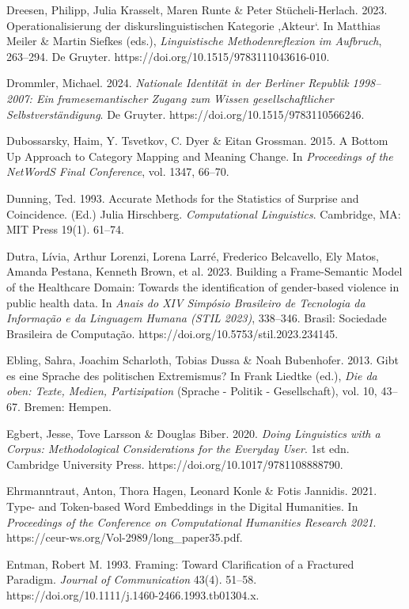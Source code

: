 Dreesen, Philipp, Julia Krasselt, Maren Runte \& Peter Stücheli-Herlach. 2023. Operationalisierung der diskurslinguistischen Kategorie ,Akteur`. In Matthias Meiler \& Martin Siefkes (eds.), \emph{Linguistische Methodenreflexion im Aufbruch}, 263--294. De Gruyter. https://doi.org/10.1515/9783111043616-010.

Drommler, Michael. 2024. \emph{Nationale Identität in der Berliner Republik 1998--2007: Ein framesemantischer Zugang zum Wissen gesellschaftlicher Selbstverständigung}. De Gruyter. https://doi.org/10.1515/9783110566246.

Dubossarsky, Haim, Y. Tsvetkov, C. Dyer \& Eitan Grossman. 2015. A Bottom Up Approach to Category Mapping and Meaning Change. In \emph{Proceedings of the NetWordS Final Conference}, vol. 1347, 66--70.

Dunning, Ted. 1993. Accurate Methods for the Statistics of Surprise and Coincidence. (Ed.) Julia Hirschberg. \emph{Computational Linguistics}. Cambridge, MA: MIT Press 19(1). 61--74.

Dutra, Lívia, Arthur Lorenzi, Lorena Larré, Frederico Belcavello, Ely Matos, Amanda Pestana, Kenneth Brown, et al. 2023. Building a Frame-Semantic Model of the Healthcare Domain: Towards the identification of gender-based violence in public health data. In \emph{Anais do XIV Simpósio Brasileiro de Tecnologia da Informação e da Linguagem Humana (STIL 2023)}, 338--346. Brasil: Sociedade Brasileira de Computação. https://doi.org/10.5753/stil.2023.234145.

Ebling, Sahra, Joachim Scharloth, Tobias Dussa \& Noah Bubenhofer. 2013. Gibt es eine Sprache des politischen Extremismus? In Frank Liedtke (ed.), \emph{Die da oben: Texte, Medien, Partizipation} (Sprache - Politik - Gesellschaft), vol. 10, 43--67. Bremen: Hempen.

Egbert, Jesse, Tove Larsson \& Douglas Biber. 2020. \emph{Doing Linguistics with a Corpus: Methodological Considerations for the Everyday User}. 1st edn. Cambridge University Press. https://doi.org/10.1017/9781108888790.

Ehrmanntraut, Anton, Thora Hagen, Leonard Konle \& Fotis Jannidis. 2021. Type- and Token-based Word Embeddings in the Digital Humanities. In \emph{Proceedings of the Conference on Computational Humanities Research 2021}. https://ceur-ws.org/Vol-2989/long\_paper35.pdf.

Entman, Robert M. 1993. Framing: Toward Clarification of a Fractured Paradigm. \emph{Journal of Communication} 43(4). 51--58. https://doi.org/10.1111/j.1460-2466.1993.tb01304.x.

